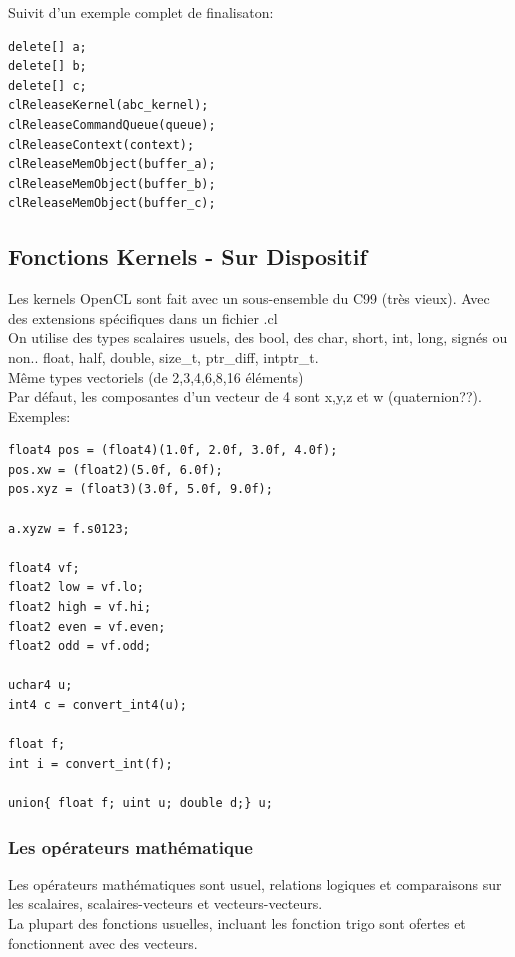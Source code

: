 \documentclass[oneside]{book}
\begin{document}
Suivit d'un exemple complet de finalisaton:
\begin{lstlisting}
delete[] a;
delete[] b;
delete[] c;
clReleaseKernel(abc_kernel);
clReleaseCommandQueue(queue);
clReleaseContext(context);
clReleaseMemObject(buffer_a);
clReleaseMemObject(buffer_b);
clReleaseMemObject(buffer_c);
\end{lstlisting}

\subsection{Fonctions Kernels - Sur Dispositif}
Les kernels OpenCL sont fait avec un sous-ensemble du C99 (très vieux). Avec des extensions spécifiques dans un fichier .cl\\

On utilise des types scalaires usuels, des bool, des char, short, int, long, signés ou non.. float, half, double, size\_t, ptr\_diff, intptr\_t.\\

Même types vectoriels  (de 2,3,4,6,8,16 éléments)\\

Par défaut, les composantes d'un vecteur de 4 sont x,y,z et w (quaternion??).\\

Exemples:
\begin{lstlisting}
float4 pos = (float4)(1.0f, 2.0f, 3.0f, 4.0f);
pos.xw = (float2)(5.0f, 6.0f);
pos.xyz = (float3)(3.0f, 5.0f, 9.0f);

a.xyzw = f.s0123;

float4 vf;
float2 low = vf.lo;
float2 high = vf.hi;
float2 even = vf.even;
float2 odd = vf.odd;

uchar4 u;
int4 c = convert_int4(u);

float f;
int i = convert_int(f);

union{ float f; uint u; double d;} u;
\end{lstlisting}
\subsubsection{Les opérateurs mathématique}
Les opérateurs mathématiques sont usuel, relations logiques et comparaisons sur les scalaires, scalaires-vecteurs et vecteurs-vecteurs. \\

La plupart des fonctions usuelles, incluant les fonction trigo sont ofertes et fonctionnent avec des vecteurs.\\
\end{document}
